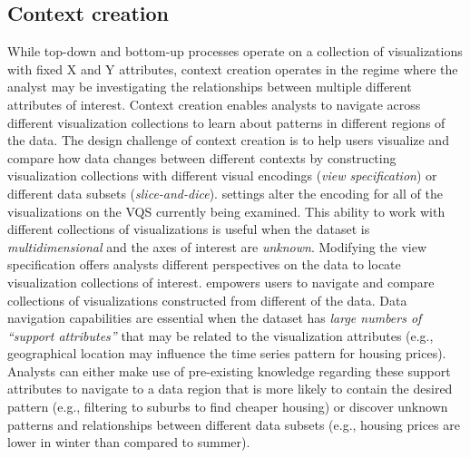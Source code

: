    \subsection{Context creation}
   While top-down and bottom-up processes operate on a collection of visualizations with fixed X and Y attributes, context creation operates in the regime where the analyst may be investigating the relationships between multiple different attributes  of interest. Context creation enables analysts to navigate across different visualization collections to learn about patterns in different regions of the data. The design challenge of context creation is to help users visualize and compare how data changes between  different contexts by constructing visualization collections with different visual encodings (\textit{view specification}) or different data subsets (\textit{slice-and-dice}).%
    settings alter the encoding for all of the visualizations on the VQS currently being examined. This ability to work with different collections of visualizations is useful when the dataset is \emph{multidimensional} and the axes of interest are \emph{unknown}. Modifying the view specification offers analysts different perspectives on the data to locate visualization collections of interest.
    empowers users to navigate and compare collections of visualizations constructed from different  of the data. Data navigation capabilities are essential when the dataset has \emph{large numbers of ``support attributes''} that may be related to the visualization attributes (e.g., geographical location may influence the time series pattern for housing prices). Analysts can either make use of pre-existing knowledge regarding these support attributes to navigate to a data region that is more likely to contain the desired pattern (e.g., filtering to suburbs to find cheaper housing) or discover unknown patterns and relationships between different data subsets (e.g., housing prices are lower in winter than compared to summer).%
